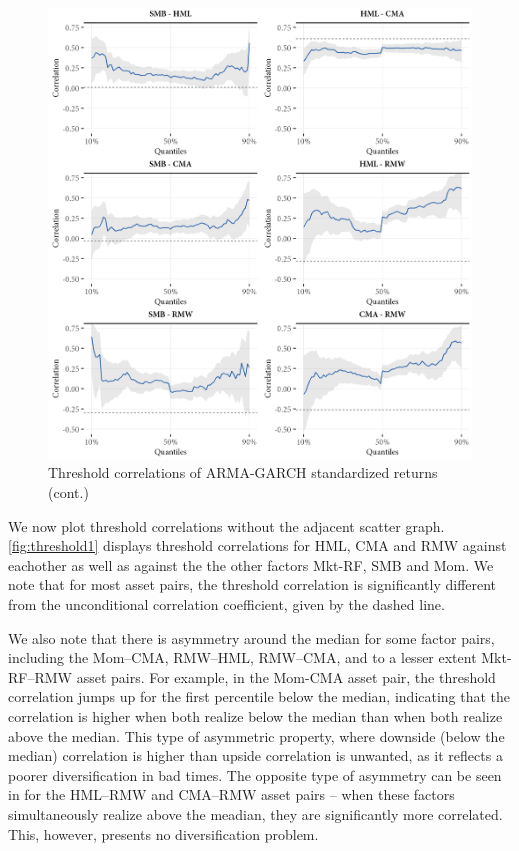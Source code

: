 \begin{figure}[!ht]
  \ContinuedFloat
  \centering

  \includegraphics[scale=1]{graphics/threshold2.png}

  \caption{Threshold correlations of ARMA-GARCH standardized returns (cont.)}
\end{figure}

We now plot threshold correlations without the adjacent scatter graph. \autoref{fig:threshold1} displays threshold correlations for HML, CMA and RMW against eachother as well as against the the other factors Mkt-RF, SMB and Mom. We note that for most asset pairs, the threshold correlation is significantly different from the unconditional correlation coefficient, given by the dashed line.

We also note that there is asymmetry around the median for some factor pairs, including the Mom--CMA, RMW--HML, RMW--CMA, and to a lesser extent Mkt-RF--RMW asset pairs. For example, in the Mom-CMA asset pair, the threshold correlation jumps up for the first percentile below the median, indicating that the correlation is higher when both realize below the median than when both realize above the median. This type of asymmetric property, where downside (below the median) correlation is higher than upside correlation is unwanted, as it reflects a poorer diversification in bad times. The opposite type of asymmetry can be seen in for the HML--RMW and CMA--RMW asset pairs -- when these factors simultaneously realize above the meadian, they are significantly more correlated. This, however, presents no diversification problem.

